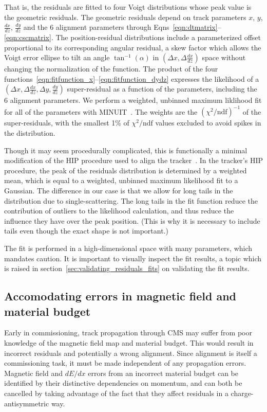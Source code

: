 \documentclass[12pt]{article}
\begin{document}
That is, the residuals are fitted to four Voigt distributions whose
peak value is the geometric residuals.  The geometric residuals depend
on track parameters $x$, $y$, $\frac{dx}{dz}$, $\frac{dy}{dz}$ and the
6 alignment parameters through
Eqns~\ref{eqn:dtmatrix}--\ref{eqn:cscmatrix}.  The position-residual
distributions include a parameterized offset proportional to its
corresponding angular residual, a skew factor which allows the Voigt
error ellipse to tilt an angle $\tan^{-1}(\alpha)$ in $(\Delta x,
\Delta \frac{dx}{dz})$ space without changing the normalization of the
function.  The product of the four
functions~\ref{eqn:fitfunction_x}--\ref{eqn:fitfunction_dydz}
expresses the likelihood of a $(\Delta x, \Delta \frac{dx}{dz}, \Delta
y, \frac{dy}{dz})$ super-residual as a function of the parameters,
including the 6 alignment parameters.  We perform a weighted, unbinned
maximum liklihood fit for all of the parameters with
MINUIT~\cite{minuit}.  The weights are the
$\left(\chi^2/\mbox{ndf}\right)^{-1}$ of the super-residuals, with the
smallest 1\% of $\chi^2/\mbox{ndf}$ values excluded to avoid spikes in
the distribution.

Though it may seem procedurally complicated, this is functionally a
minimal modification of the HIP procedure used to align the
tracker~\cite{trackerhip}.  In the tracker's HIP procedure, the peak
of the residuals distribution is determined by a weighted mean, which
is equal to a weighted, unbinned maximum likelihood fit to a Gaussian.
The difference in our case is that we allow for long tails in the
distribution due to single-scattering.  The long tails in the fit
function reduce the contribution of outliers to the likelihood
calculation, and thus reduce the influence they have over the peak
position.  (This is why it is necessary to include tails even though
the exact shape is not important.)

The fit is performed in a high-dimensional space with many parameters,
which mandates caution.  It is important to visually inspect the fit
results, a topic which is raised in
section~\ref{sec:validating_residuals_fits} on validating the fit
results.

\subsection{Accomodating errors in magnetic field and material budget}
\label{sec:bfield_errors}

Early in commissioning, track propagation through CMS may suffer from
poor knowledge of the magnetic field map and material budget.  This
would result in incorrect residuals and potentially a wrong alignment.
Since alignment is itself a commissioning task, it must be made
independent of any propagation errors.  Magnetic field and $dE/dx$
errors from an incorrect material budget can be identified by their
distinctive dependencies on momentum, and can both be cancelled by
taking advantage of the fact that they affect residuals in a
charge-antisymmetric way.
\end{document}
